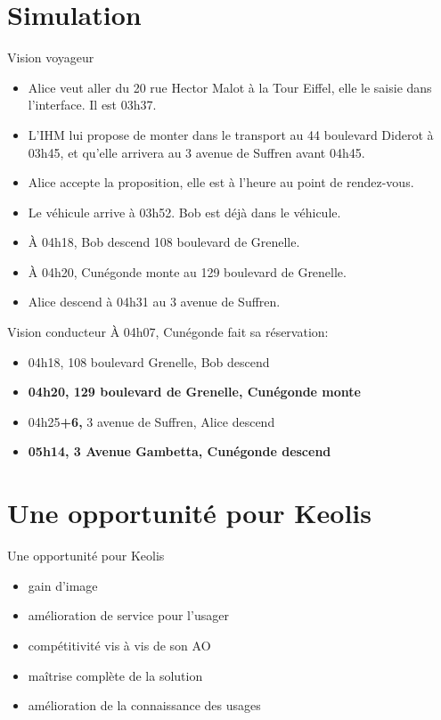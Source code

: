 \documentclass[table]{beamer}
\begin{document}
\section{Simulation}

\begin{frame}{Vision voyageur}

  \begin{itemize}[<+->]
  \item Alice veut aller du 20 rue Hector Malot à la Tour Eiffel, elle
    le saisie dans l'interface. Il est 03h37.
  \item L'IHM lui propose de monter dans le transport au 44 boulevard
    Diderot à 03h45, et qu'elle arrivera au 3 avenue de Suffren avant
    04h45.
  \item Alice accepte la proposition, elle est à l'heure au point de
    rendez-vous.
  \item Le véhicule arrive à 03h52. Bob est déjà dans le véhicule.
  \item À 04h18, Bob descend 108 boulevard de Grenelle.
  \item À 04h20, Cunégonde monte au 129 boulevard de Grenelle.
  \item Alice descend à 04h31 au 3 avenue de Suffren.
  \end{itemize}
\end{frame}

\begin{frame}{Vision conducteur}
  À 04h07, Cunégonde fait sa réservation:
  \begin{itemize}
  \item 04h18, 108 boulevard Grenelle, Bob descend
  \item \textbf{04h20, 129 boulevard de Grenelle, Cunégonde monte}
  \item 04h25\textbf{+6,} 3 avenue de Suffren, Alice descend
  \item \textbf{05h14, 3 Avenue Gambetta, Cunégonde descend}
  \end{itemize}
\end{frame}

\section{Une opportunité pour Keolis}

\begin{frame}{Une opportunité pour Keolis}

  \begin{itemize}
  \item gain d'image
  \item amélioration de service pour l'usager
  \item compétitivité vis à vis de son AO
  \item maîtrise complète de la solution
  \item amélioration de la connaissance des usages
  \end{itemize}
\end{frame}
\end{document}

